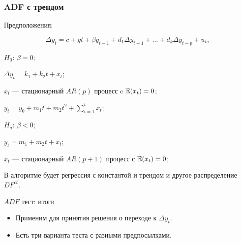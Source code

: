 \begin{frame}
  \frametitle{ADF с трендом}


  Предположения:

  \[
  \Delta y_t = c + g t + \beta y_{t-1} + d_1 \Delta y_{t-1} + \ldots + d_k \Delta y_{t-p} + u_t,  
  \]

  \pause

  $H_0$: $\beta = 0$;
  
  $\Delta y_t = k_1 + k_2 t + x_t$;
  
  $x_t$ — стационарный $AR(p)$ процесс c $\mathbb{E}(x_t) = 0$;

  $y_t = y_0 + m_1 t + m_2 t^2 + \sum_{i=1}^t x_t$;

  \pause

  $H_a$: $\beta < 0$;

  $y_t = m_1 + m_2 t + x_t$;
  
  $x_t$ — стационарный $AR(p + 1)$ процесс с $\mathbb{E}(x_t) = 0$;

  \pause 

  В алгоритме будет регрессия \alert{с константой и трендом} и другое распределение $DF^{ct}$.

\end{frame}

\begin{frame}{$ADF$ тест: итоги}

  \begin{itemize}[<+->]
    \item Применим для принятия решения о переходе к $\Delta y_t$.
    \item Есть три варианта теста с разными предпосылками.
  \end{itemize}
\end{frame}



